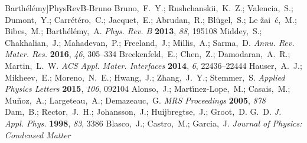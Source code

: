 \documentclass[aip,graphicx,numerical]{revtex4-1}
\begin{document}
\begin{mcitethebibliography}{33}
  Barth\'el\'emy]{PhysRevB-Bruno}
Bruno,~F.~Y.; Rushchanskii,~K.~Z.; Valencia,~S.; Dumont,~Y.; Carr\'et\'ero,~C.;
  Jacquet,~E.; Abrudan,~R.; Bl\"ugel,~S.; Le\ifmmode {}\else
  \v{z}\fi{}ai\ifmmode~\else \'{c}\fi{},~M.; Bibes,~M.;
  Barth\'el\'emy,~A. \emph{Phys. Rev. B} \textbf{2013}, \emph{88}, 195108\relax
\mciteBstWouldAddEndPuncttrue
\mciteSetBstMidEndSepPunct{\mcitedefaultmidpunct}
{\mcitedefaultendpunct}{\mcitedefaultseppunct}\relax
\EndOfBibitem
{}
Middey,~S.; Chakhalian,~J.; Mahadevan,~P.; Freeland,~J.; Millis,~A.; Sarma,~D.
  \emph{Annu. Rev. Mater. Res.} \textbf{2016}, \emph{46}, 305--334\relax
\mciteBstWouldAddEndPuncttrue
\mciteSetBstMidEndSepPunct{\mcitedefaultmidpunct}
{\mcitedefaultendpunct}{\mcitedefaultseppunct}\relax
\EndOfBibitem
{}
Breckenfeld,~E.; Chen,~Z.; Damodaran,~A.~R.; Martin,~L.~W. \emph{{ACS} Appl.
  Mater. Interfaces} \textbf{2014}, \emph{6}, 22436--22444\relax
\mciteBstWouldAddEndPuncttrue
\mciteSetBstMidEndSepPunct{\mcitedefaultmidpunct}
{\mcitedefaultendpunct}{\mcitedefaultseppunct}\relax
\EndOfBibitem
{}
Hauser,~A.~J.; Mikheev,~E.; Moreno,~N.~E.; Hwang,~J.; Zhang,~J.~Y.; Stemmer,~S.
  \emph{Applied Physics Letters} \textbf{2015}, \emph{106}, 092104\relax
\mciteBstWouldAddEndPuncttrue
\mciteSetBstMidEndSepPunct{\mcitedefaultmidpunct}
{\mcitedefaultendpunct}{\mcitedefaultseppunct}\relax
\EndOfBibitem
{}
Alonso,~J.; Mart{\'{\i}}nez-Lope,~M.; Casais,~M.; Mu{\~{n}}oz,~A.;
  Largeteau,~A.; Demazeauc,~G. \emph{MRS Proceedings} \textbf{2005},
  \emph{878}\relax
\mciteBstWouldAddEndPuncttrue
\mciteSetBstMidEndSepPunct{\mcitedefaultmidpunct}
{\mcitedefaultendpunct}{\mcitedefaultseppunct}\relax
\EndOfBibitem
{}
Dam,~B.; Rector,~J.~H.; Johansson,~J.; Huijbregtse,~J.; Groot,~D. G.~D.
  \emph{J. Appl. Phys.} \textbf{1998}, \emph{83}, 3386\relax
\mciteBstWouldAddEndPuncttrue
\mciteSetBstMidEndSepPunct{\mcitedefaultmidpunct}
{\mcitedefaultendpunct}{\mcitedefaultseppunct}\relax
\EndOfBibitem
{}
Blasco,~J.; Castro,~M.; Garcia,~J. \emph{Journal of Physics: Condensed Matter}

\end{mcitethebibliography}
\end{document}

